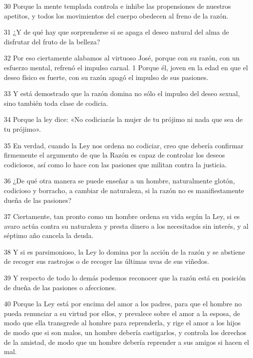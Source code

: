 \par 30 Porque la mente templada controla e inhibe las propensiones de nuestros apetitos, y todos los movimientos del cuerpo obedecen al freno de la razón.

\par 31 ¿Y de qué hay que sorprenderse si se apaga el deseo natural del alma de disfrutar del fruto de la belleza?

\par 32 Por eso ciertamente alabamos al virtuoso José, porque con su razón, con un esfuerzo mental, refrenó el impulso carnal. 1 Porque él, joven en la edad en que el deseo físico es fuerte, con su razón apagó el impulso de sus pasiones.

\par 33 Y está demostrado que la razón domina no sólo el impulso del deseo sexual, sino también toda clase de codicia.

\par 34 Porque la ley dice: «No codiciarás la mujer de tu prójimo ni nada que sea de tu prójimo».

\par 35 En verdad, cuando la Ley nos ordena no codiciar, creo que debería confirmar firmemente el argumento de que la Razón es capaz de controlar los deseos codiciosos, así como lo hace con las pasiones que militan contra la justicia.

\par 36 ¿De qué otra manera se puede enseñar a un hombre, naturalmente glotón, codicioso y borracho, a cambiar de naturaleza, si la razón no es manifiestamente dueña de las pasiones?

\par 37 Ciertamente, tan pronto como un hombre ordena su vida según la Ley, si es avaro actúa contra su naturaleza y presta dinero a los necesitados sin interés, y al séptimo año cancela la deuda.

\par 38 Y si es parsimonioso, la Ley lo domina por la acción de la razón y se abstiene de recoger sus rastrojos o de recoger las últimas uvas de sus viñedos.

\par 39 Y respecto de todo lo demás podemos reconocer que la razón está en posición de dueña de las pasiones o afecciones.

\par 40 Porque la Ley está por encima del amor a los padres, para que el hombre no pueda renunciar a su virtud por ellos, y prevalece sobre el amor a la esposa, de modo que ella transgrede al hombre para reprenderla, y rige el amor a los hijos de modo que si son malos, un hombre debería castigarlos, y controla los derechos de la amistad, de modo que un hombre debería reprender a sus amigos si hacen el mal.


